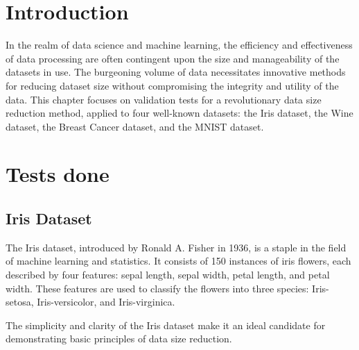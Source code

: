 \section{Introduction}

In the realm of data science and machine learning, the efficiency and effectiveness of data processing are often contingent upon the size and manageability of the datasets in use. The burgeoning volume of data necessitates innovative methods for reducing dataset size without compromising the integrity and utility of the data. This chapter focuses on validation tests for a revolutionary data size reduction method, applied to four well-known datasets: the Iris dataset, the Wine dataset, the Breast Cancer dataset, and the MNIST dataset.



\section{Tests done}
\subsection{Iris Dataset}

The Iris dataset, introduced by Ronald A. Fisher in 1936, is a staple in the field of machine learning and statistics. It consists of 150 instances of iris flowers, each described by four features: sepal length, sepal width, petal length, and petal width. These features are used to classify the flowers into three species: Iris-setosa, Iris-versicolor, and Iris-virginica. 

The simplicity and clarity of the Iris dataset make it an ideal candidate for demonstrating basic principles of data size reduction.

